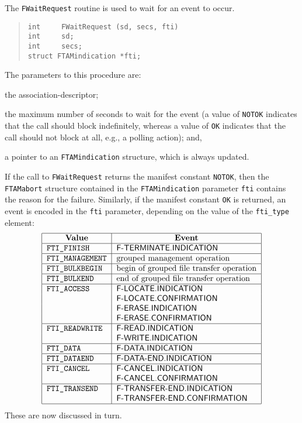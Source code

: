 The \verb"FWaitRequest" routine is used to wait for an event to occur.
\begin{quote}\small\begin{verbatim}
int     FWaitRequest (sd, secs, fti)
int     sd;
int     secs;
struct FTAMindication *fti;
\end{verbatim}\end{quote}
The parameters to this procedure are:
\begin{describe}
\item[\verb"sd":] the association-descriptor;

\item[\verb"secs":] the maximum number of seconds to wait for the event
(a value of \verb"NOTOK" indicates that the call should block indefinitely,
whereas a value of \verb"OK" indicates that the call should not block at all,
e.g., a polling action);
and,

\item[\verb"fti":] a pointer to an \verb"FTAMindication" structure,
which is always updated.
\end{describe}
If the call to \verb"FWaitRequest" returns the manifest constant \verb"NOTOK",
then the \verb"FTAMabort" structure contained in the \verb"FTAMindication"
parameter \verb"fti" contains the reason for the failure.
Similarly,
if the manifest constant \verb"OK" is returned,
an event is encoded in the \verb"fti" parameter,
depending on the value of the \verb"fti_type" element:
\[\begin{tabular}{|l|l|}
\hline
    \multicolumn{1}{|c|}{\bf Value}&
			\multicolumn{1}{c|}{\bf Event}\\
\hline
    \tt FTI\_FINISH&		\sf F-TERMINATE.INDICATION\\
\hline
    \tt FTI\_MANAGEMENT&	grouped management operation\\
\hline
    \tt FTI\_BULKBEGIN&		begin of grouped file transfer operation\\
\hline
    \tt FTI\_BULKEND&		end of grouped file transfer operation\\
\hline
    \tt FTI\_ACCESS&		\sf F-LOCATE.INDICATION\\
	&			\sf F-LOCATE.CONFIRMATION\\
	&			\sf F-ERASE.INDICATION\\
	&			\sf F-ERASE.CONFIRMATION\\
\hline
    \tt FTI\_READWRITE&		\sf F-READ.INDICATION\\
	&			\sf F-WRITE.INDICATION\\
\hline
    \tt FTI\_DATA&		\sf F-DATA.INDICATION\\
\hline
    \tt FTI\_DATAEND&		\sf F-DATA-END.INDICATION\\
\hline
    \tt FTI\_CANCEL&		\sf F-CANCEL.INDICATION\\
	&			\sf F-CANCEL.CONFIRMATION\\
\hline
    \tt FTI\_TRANSEND&		\sf F-TRANSFER-END.INDICATION\\
	&			\sf F-TRANSFER-END.CONFIRMATION\\
\hline
\end{tabular}\]
These are now discussed in turn.

